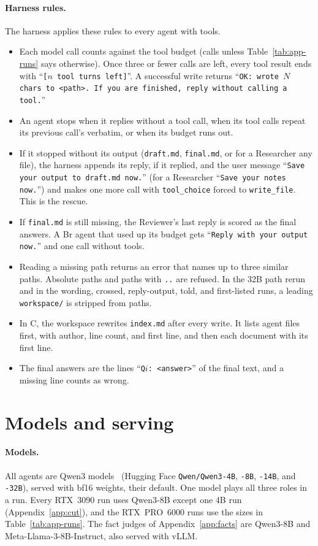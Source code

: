 \documentclass[sigplan,10pt,nonacm,review,anonymous]{acmart}
\begin{document}
\paragraph{Harness rules.} The harness applies these rules to every agent with tools.
\begin{itemize}
\item Each model call counts against the tool budget (\nTurns calls unless Table~\ref{tab:app-runs} says
otherwise). Once three or
fewer calls are left, every tool result ends with ``\texttt{[$n$ tool turns left]}''. A successful write
returns ``\texttt{OK: wrote $N$ chars to <path>. If you are finished, reply without calling a tool.}''
\item An agent stops when it replies without a tool call, when its tool calls repeat its previous call's
verbatim, or when its budget runs out.
\item If it stopped without its output (\texttt{draft.md}, \texttt{final.md}, or for a Researcher any file), the
harness appends its reply, if it replied, and the user message ``\texttt{Save your output to draft.md now.}'' (for a Researcher
``\texttt{Save your notes now.}'') and makes one more call with \texttt{tool\_choice} forced to
\texttt{write\_file}. This is the rescue.
\item If \texttt{final.md} is still missing, the Reviewer's last reply is scored as the final answers. A Br agent
that used up its budget gets ``\texttt{Reply with your output now.}'' and one call without tools.
\item Reading a missing path returns an error that names up to three similar paths. Absolute paths and paths with
\texttt{..} are refused. In the 32B path rerun and in the wording, crossed, reply-output, told, and first-listed
runs, a leading \texttt{workspace/} is stripped from paths.
\item In C, the workspace rewrites \texttt{index.md} after every write. It lists agent files first, with author,
line count, and first line, and then each document with its first line.
\item The final answers are the lines ``\texttt{Q$i$: <answer>}'' of the final text, and a missing line counts
as wrong.
\end{itemize}

\section{Models and serving}
\label{app:serving}

\paragraph{Models.} All agents are Qwen3 models~\cite{qwen3} (Hugging Face \texttt{Qwen/}\allowbreak\texttt{Qwen3-4B}, \texttt{-8B},
\texttt{-14B}, and \texttt{-32B}), served with bf16 weights, their default. One model plays all three roles in
a run. Every RTX~3090 run uses Qwen3-8B except one 4B run (Appendix~\ref{app:cut}), and the RTX~PRO~6000 runs
use the sizes in Table~\ref{tab:app-runs}. The fact judges of Appendix~\ref{app:facts} are Qwen3-8B and
Meta-Llama-3-8B-Instruct, also served with vLLM.
\end{document}
